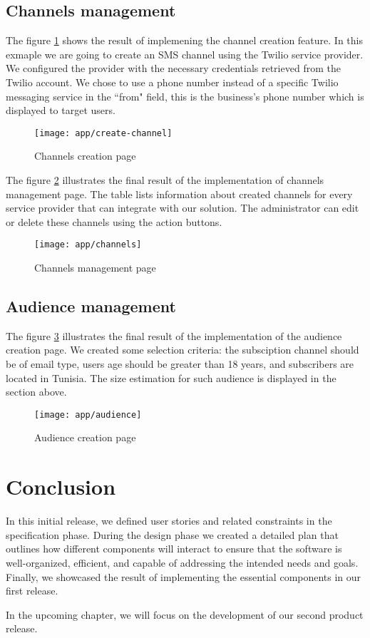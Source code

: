\subsection{Channels management}
The figure \ref{ss-create-channel} shows the result of implemening the channel creation feature.
In this exmaple we are going to create an SMS channel using the Twilio service provider. We configured
the provider with the necessary credentials retrieved from the Twilio account. We chose to use a phone number
instead of a specific Twilio messaging service in the ``from" field, this is the business's phone number
which is displayed to target users.

\begin{figure}[hbt!]
    \centering
    \texttt{[image: app/create-channel]}
    \caption{Channels creation page}
    \label{ss-create-channel}
\end{figure}

The figure \ref{ss-channels} illustrates the final result of the implementation of channels management page. The table
lists information about created channels for every service provider that can integrate with our solution. The
administrator can edit or delete these channels using the action buttons.
\begin{figure}[hbt!]
    \centering
    \texttt{[image: app/channels]}
    \caption{Channels management page}
    \label{ss-channels}
\end{figure}

\subsection{Audience management}
The figure \ref{ss-audience} illustrates the final result of the implementation of the audience creation page.
We created some selection criteria: the subsciption channel should be of email type, users age should be greater
than 18 years, and subscribers are located in Tunisia. The size estimation for such audience is displayed in the section above.
\begin{figure}[hbt!]
    \centering
    \texttt{[image: app/audience]}
    \caption{Audience creation page}
    \label{ss-audience}
\end{figure}


\section*{Conclusion}

In this initial release, we defined user stories and related constraints in the specification phase.
During the design phase we created a detailed plan that outlines how different components will interact to
ensure that the software is well-organized, efficient, and capable of addressing the intended needs and
goals. Finally, we showcased the result of implementing the essential components in our first release.

\noindent In the upcoming chapter, we will focus on the development of our second product release.